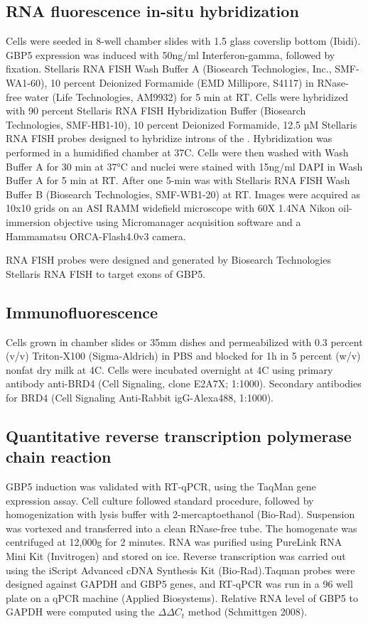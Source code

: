 \documentclass{ucetd}
\begin{document}
\subsection{RNA fluorescence in-situ hybridization}

Cells were seeded in 8-well chamber slides with 1.5 glass coverslip bottom (Ibidi). GBP5 expression was induced with 50ng/ml Interferon-gamma, followed by fixation. Stellaris RNA FISH Wash Buffer A (Biosearch Technologies, Inc., SMF-WA1-60), 10  percent  Deionized Formamide (EMD Millipore, S4117) in RNase-free water (Life Technologies, AM9932) for 5 min at RT. Cells were hybridized with 90  percent  Stellaris RNA FISH Hybridization Buffer (Biosearch Technologies, SMF-HB1-10), 10  percent  Deionized Formamide, 12.5 µM Stellaris RNA FISH probes designed to hybridize introns of the . Hybridization was performed in a humidified chamber at 37C. Cells were then washed with Wash Buffer A for 30 min at 37°C and nuclei were stained with 15ng/ml DAPI in Wash Buffer A for 5 min at RT. After one 5-min was with Stellaris RNA FISH Wash Buffer B (Biosearch Technologies, SMF-WB1-20) at RT. Images were acquired as 10x10 grids on an ASI RAMM widefield microscope with 60X 1.4NA Nikon oil-immersion objective using Micromanager acquisition software and a Hammamatsu ORCA-Flash4.0v3 camera.  

RNA FISH probes were designed and generated by Biosearch Technologies Stellaris RNA FISH to target exons of GBP5. 

\subsection{Immunofluorescence}

Cells grown in chamber slides or 35mm dishes and permeabilized with 0.3  percent  (v/v) Triton-X100 (Sigma-Aldrich) in PBS and blocked for 1h in 5  percent  (w/v) nonfat dry milk at 4C. Cells were incubated overnight at 4C using primary antibody anti-BRD4 (Cell Signaling, clone E2A7X; 1:1000). Secondary antibodies for BRD4 (Cell Signaling Anti-Rabbit igG-Alexa488, 1:1000). 

\subsection{Quantitative reverse transcription polymerase chain reaction}

GBP5 induction was validated with RT-qPCR, using the TaqMan gene expression assay. Cell culture followed standard procedure, followed by homogenization with lysis buffer with 2-mercaptoethanol (Bio-Rad). Suspension was vortexed and transferred into a clean RNase-free tube. The homogenate was centrifuged at 12,000g for 2 minutes. RNA was purified using PureLink RNA Mini Kit (Invitrogen) and stored on ice. Reverse transcription was carried out using the iScript Advanced cDNA Synthesis Kit (Bio-Rad).Taqman probes were designed against GAPDH and GBP5 genes, and RT-qPCR was run in a 96 well plate on a qPCR machine (Applied Biosystems). Relative RNA level of GBP5 to GAPDH were computed using the $\Delta\Delta C_{t}$ method (Schmittgen 2008). 
\end{document}
